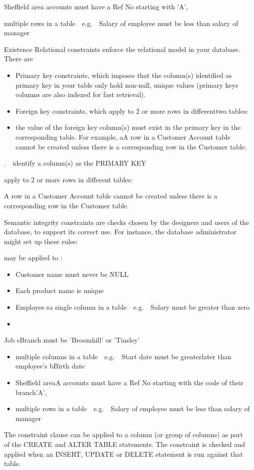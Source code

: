 Sheffield area accounts must have a Ref No starting with 'A',

multiple rows in a table\ \ e.g.\ \ Salary of employee must be less than salary of manager

Existence Relational constraints enforce the relational model in your database. There are

\begin{itemize}
\item Primary key constraints, which imposes that the column(s) identified as primary key in your table only hold non-null, unique values (primary keys columns are also indexed for fast retrieval).
\item Foreign key constraints, which apply to 2 or more rows in differenttwo tables: 
\item the value of the foreign key column(s) must exist in the primary key in the corresponding table. For example, aA row in a {\textquotedbl}Customer Account{\textquotedbl} table cannot be created unless there is a corresponding row in the {\textquotedbl}Customer{\textquotedbl} table.
\end{itemize}
.\ \ identify a column(s) as the PRIMARY KEY

apply to 2 or more rows in different tables:

A row in a Customer Account table cannot be created unless there is a corresponding row in the Customer table.

Semantic integrity constraints are checks chosen by the designers and users of the database, to support its correct use. For instance, the database administrator might set up these rules:

may be applied to :

\begin{itemize}
\item Customer name must never be NULL
\item Each product name is unique
\item Employee sa single column in a table\ \ e.g.\ \ Salary must be greater than zero
\item \end{itemize}
Job sBranch must be 'Broomhill' or 'Tinsley'

\begin{itemize}
\item multiple columns in a table\ \ e.g.\ \ Start date must be greaterlater than  employee's bBirth date
\item Sheffield areaA accounts must have a Ref No starting with the code of their branch{}'A',
\item multiple rows in a table\ \ e.g.\ \ Salary of employee must be less than salary of manager
\end{itemize}
The constraint clause can be applied to a column (or group of columns) as part of the CREATE and ALTER TABLE statements.  The constraint is checked and applied when an INSERT, UPDATE or DELETE statement is run against that table.

